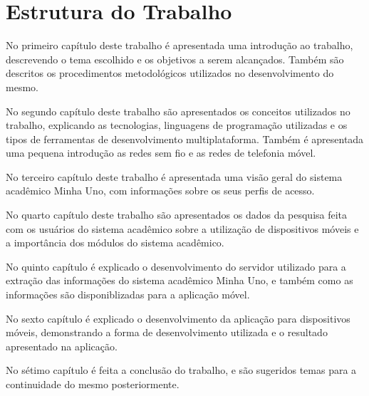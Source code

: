\section{Estrutura do Trabalho}
No primeiro capítulo deste trabalho é apresentada uma introdução ao trabalho, descrevendo o tema escolhido e os objetivos a serem alcançados. Também são descritos os procedimentos metodológicos utilizados no desenvolvimento do mesmo.

No segundo capítulo deste trabalho são apresentados os conceitos utilizados no trabalho, explicando as tecnologias, linguagens de programação utilizadas e os tipos de ferramentas de desenvolvimento multiplataforma. Também é apresentada uma pequena introdução as redes sem fio e as redes de telefonia móvel.

No terceiro capítulo deste trabalho é apresentada uma visão geral do sistema acadêmico Minha Uno, com informações sobre os seus perfis de acesso.

No quarto capítulo deste trabalho são apresentados os dados da pesquisa feita com os usuários do sistema acadêmico sobre a utilização de dispositivos móveis e a importância dos módulos do sistema acadêmico.

No quinto capítulo é explicado o desenvolvimento do servidor utilizado para a extração das informações do sistema acadêmico Minha Uno, e também como as informações são disponiblizadas para a aplicação móvel.

No sexto capítulo é explicado o desenvolvimento da aplicação para dispositivos móveis, demonstrando a forma de desenvolvimento utilizada e o resultado apresentado na aplicação.

No sétimo capítulo é feita a conclusão do trabalho, e são sugeridos temas para a continuidade do mesmo posteriormente.